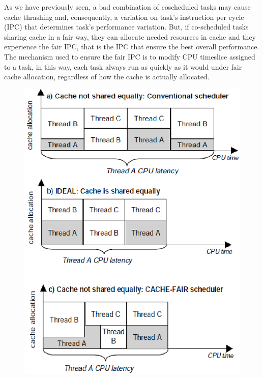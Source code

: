 \begin{description}
As we have previously seen, a bad combination of coscheduled tasks may cause cache thrashing and, consequently, a variation on task's instruction per cycle
(IPC) that determines task's performance variation. But, if co-scheduled tasks sharing cache in a fair way, they can allocate needed resources in cache and
they experience the fair IPC, that is the IPC that ensure the best overall performance. The mechanism used to ensure the fair IPC is to modify CPU timeslice 
assigned to a task, in this way, each task always run as quickly as it would under fair cache allocation, regardless of how the cache is actually allocated.

\begin{figure}[htbp]
\centering
\includegraphics[width=\widefigure]{images/fed_cases.eps}
\caption{}
\label{fig:fed_cases}
\end{figure}



\end{description}
